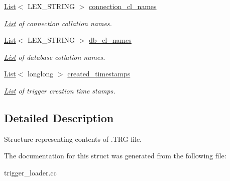 \begin{DoxyCompactItemize}
\mbox{\label{structTrg__file__data_a99487118fcf782e50a57197c4a671d33}} 
\mbox{\hyperlink{classList}{List}}$<$ L\+E\+X\+\_\+\+S\+T\+R\+I\+NG $>$ \mbox{\hyperlink{structTrg__file__data_a99487118fcf782e50a57197c4a671d33}{connection\+\_\+cl\+\_\+names}}
\begin{DoxyCompactList}\small\item\em \mbox{\hyperlink{classList}{List}} of connection collation names. \end{DoxyCompactList}\item 
\mbox{\label{structTrg__file__data_a2f35ed1441da4c90ca11f2f59ad46e1a}} 
\mbox{\hyperlink{classList}{List}}$<$ L\+E\+X\+\_\+\+S\+T\+R\+I\+NG $>$ \mbox{\hyperlink{structTrg__file__data_a2f35ed1441da4c90ca11f2f59ad46e1a}{db\+\_\+cl\+\_\+names}}
\begin{DoxyCompactList}\small\item\em \mbox{\hyperlink{classList}{List}} of database collation names. \end{DoxyCompactList}\item 
\mbox{\label{structTrg__file__data_a8b7ca2c872bacaa59305c267b8a05cbc}} 
\mbox{\hyperlink{classList}{List}}$<$ longlong $>$ \mbox{\hyperlink{structTrg__file__data_a8b7ca2c872bacaa59305c267b8a05cbc}{created\+\_\+timestamps}}
\begin{DoxyCompactList}\small\item\em \mbox{\hyperlink{classList}{List}} of trigger creation time stamps. \end{DoxyCompactList}\end{DoxyCompactItemize}


\subsection{Detailed Description}
Structure representing contents of .T\+RG file. 

The documentation for this struct was generated from the following file\+:\begin{DoxyCompactItemize}
\item 
trigger\+\_\+loader.\+cc\end{DoxyCompactItemize}
